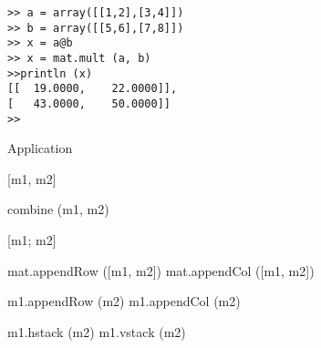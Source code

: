 \begin{lstlisting}
>> a = array([[1,2],[3,4]])
>> b = array([[5,6],[7,8]])
>> x = a@b
>> x = mat.mult (a, b)
>>println (x)
[[  19.0000,    22.0000]],
[   43.0000,    50.0000]]
>>
\end{lstlisting}

Application

[m1, m2]

combine (m1, m2)

[m1; m2]

mat.appendRow ([m1, m2])
mat.appendCol ([m1, m2])

m1.appendRow (m2)
m1.appendCol (m2)

m1.hstack (m2)
m1.vstack (m2)

%
%
%
%
%
%
%
%
%
%
%
%
